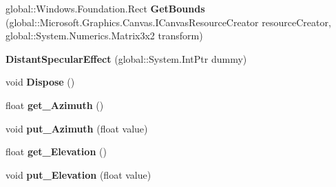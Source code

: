 \begin{DoxyCompactItemize}
\item 
\mbox{\label{class_microsoft_1_1_graphics_1_1_canvas_1_1_effects_1_1_distant_specular_effect_a1767db5f8057f907e45b60d25f75e9dc}} 
global\+::\+Windows.\+Foundation.\+Rect {\bfseries Get\+Bounds} (global\+::\+Microsoft.\+Graphics.\+Canvas.\+I\+Canvas\+Resource\+Creator resource\+Creator, global\+::\+System.\+Numerics.\+Matrix3x2 transform)
\item 
\mbox{\label{class_microsoft_1_1_graphics_1_1_canvas_1_1_effects_1_1_distant_specular_effect_aa2fbc147e71a970a34acd9561a293e56}} 
{\bfseries Distant\+Specular\+Effect} (global\+::\+System.\+Int\+Ptr dummy)
\item 
\mbox{\label{class_microsoft_1_1_graphics_1_1_canvas_1_1_effects_1_1_distant_specular_effect_ac11d721e79988e45b94991e5cdc3d657}} 
void {\bfseries Dispose} ()
\item 
\mbox{\label{class_microsoft_1_1_graphics_1_1_canvas_1_1_effects_1_1_distant_specular_effect_a35fe5c8a011c041580982ff75ca14124}} 
float {\bfseries get\+\_\+\+Azimuth} ()
\item 
\mbox{\label{class_microsoft_1_1_graphics_1_1_canvas_1_1_effects_1_1_distant_specular_effect_a1b449dcf21ebdf14e78e3290fd2499e5}} 
void {\bfseries put\+\_\+\+Azimuth} (float value)
\item 
\mbox{\label{class_microsoft_1_1_graphics_1_1_canvas_1_1_effects_1_1_distant_specular_effect_af9ecc12205307d103f4910a7a0c342d8}} 
float {\bfseries get\+\_\+\+Elevation} ()
\item 
\mbox{\label{class_microsoft_1_1_graphics_1_1_canvas_1_1_effects_1_1_distant_specular_effect_a8912f90f792fc3eda78bb6079a26a679}} 
void {\bfseries put\+\_\+\+Elevation} (float value)

\end{DoxyCompactItemize}

